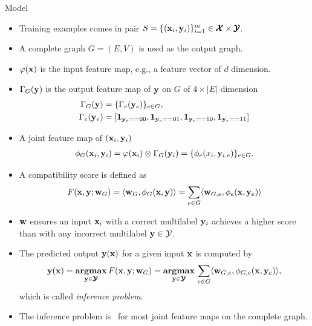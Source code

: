 \documentclass[first=dgreen,second=purple,logo=yellowexc]{aaltoslides}
\begin{document}
%
\begin{frame}[allowframebreaks]{Model}
	\begin{itemize}\footnotesize
		\item Training examples comes in pair $S=\{(\mathbf {x}_i,\mathbf {y}_i)\}_{i=1}^{m}\in\pmb {\mathcal{X}}\times\pmb {\mathcal{Y}}$.
		\item A complete graph $G=(E,V)$ is used as the output graph.
		\item $\varphi(\mathbf {x})$ is the input feature map, e.g., a feature vector of $d$ dimension.
		\item $\Gamma_G(\mathbf {y})$ is the output feature map of $\mathbf {y}$ on $G$ of $4\times |E|$ dimension
		\begin{align*}
			\Gamma_G(\mathbf {y}) &= \{\Gamma_e(\mathbf {y}_{e})\}_{e\in G},\\
			 \Gamma_e(\mathbf {y}_{e}) &= [\mathbf {1}_{\mathbf {y}_{e}==00},\mathbf {1}_{\mathbf {y}_{e}==01},\mathbf {1}_{\mathbf {y}_{e}==10},\mathbf {1}_{\mathbf {y}_{e}==11}]
		\end{align*}
		\item A joint feature map of $(\mathbf {x}_i,\mathbf {y}_i)$
		\begin{align*}
			\phi_G(\mathbf {x}_i,\mathbf {y}_i) = \varphi(\mathbf {x}_i)\otimes\Gamma_G(\mathbf {y}_i) = \{\phi_e(x_i,\mathbf {y}_{i,e})\}_{e\in G}.
		\end{align*}
		\item A compatibility score is defined as
		\begin{align*}
			F(\mathbf {x},\mathbf {y};\mathbf {w}_G) = \langle \mathbf {w}_G, \phi_G(\mathbf {x},\mathbf {y}) \rangle=\sum_{e\in G}\langle \mathbf {w}_{G,e}, \phi_e(\mathbf {x},\mathbf {y}_{e}) \rangle
		\end{align*}
		\item $\mathbf {w}$ ensures an input $\mathbf {x}_i$ with a correct multilabel $\mathbf {y}_i$ achieves a higher score than with any incorrect multilabel $\mathbf {y}\in\mathcal{Y}$.
		\item The predicted output $\mathbf {y}(\mathbf {x})$ for a given input $\mathbf {x}$ is computed by
		\begin{align*}
			\mathbf {y}(\mathbf {x}) = \underset{\mathbf {y}\in\pmb {\mathcal{Y}}}{\textbf{argmax}}\,F(\mathbf {x},\mathbf {y};\mathbf {w}_G) = \underset{\mathbf {y}\in\pmb {\mathcal{Y}}}{\textbf{argmax}}\,\sum_{e\in G}\langle \mathbf {w}_{G,e}, \phi_{G,e}(\mathbf {x},\mathbf {y}_e) \rangle,
		\end{align*}
		which is called \textit{inference problem}.
		\item The {inference problem} is \nphard\ for most joint feature maps on the complete graph.
	\end{itemize}
\end{frame}
\end{document}
